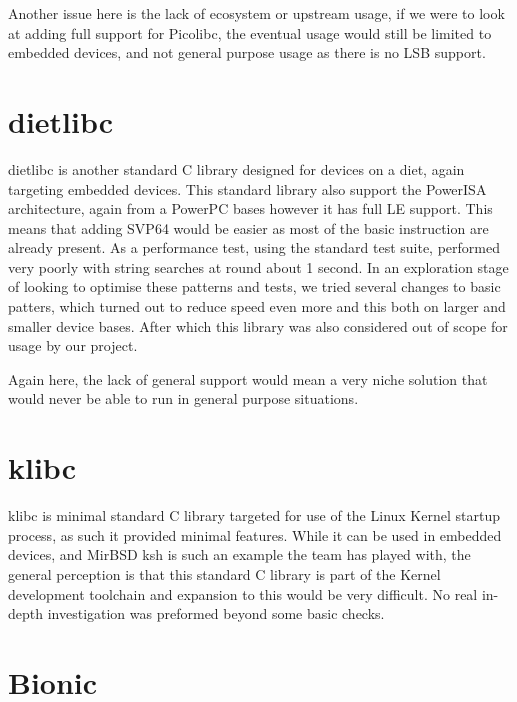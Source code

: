 Another issue here is the lack of ecosystem or upstream usage, if we were to look at adding full support for Picolibc,
the eventual usage would still be limited to embedded devices, and not general purpose usage as there is no \acrfull{LSB} support.
\par

\section{dietlibc}

dietlibc is another standard C library designed for devices on a diet, again targeting embedded devices.
This standard library also support the PowerISA architecture, again from a PowerPC bases however it has full \acrfull{LE} support.
This means that adding SVP64 would be easier as most of the basic instruction are already present.
As a performance test, using the standard test suite, performed very poorly with string searches at round about 1 second.
In an exploration stage of looking to optimise these patterns and tests, we tried several changes to basic patters,
which turned out to reduce speed even more and this both on larger and smaller device bases.
After which this library was also considered out of scope for usage by our project.
\par

Again here, the lack of general support would mean a very niche solution that would never be able to run in general purpose situations.
\par

\section{klibc}
\label{content:klibc}

klibc is minimal standard C library targeted for use of the Linux Kernel startup process, as such it provided minimal features.
While it can be used in embedded devices, and MirBSD ksh is such an example the team has played with,
the general perception is that this standard C library is part of the Kernel development toolchain and expansion to this would be very difficult.
No real in-depth investigation was preformed beyond some basic checks.
\par

\section{Bionic}

